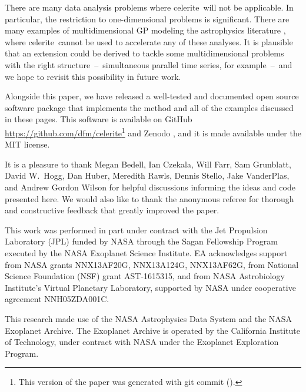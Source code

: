\documentclass[manuscript, letterpaper]{aastex6}
\makeatletter
\let\origsubsection\subsection
\renewcommand\subsection{\@ifstar{\starsubsection}{\nostarsubsection}}
\newcommand\nostarsubsection[1]{\subsectionprelude\origsubsection{#1}}
\newcommand\starsubsection[1]{\subsectionprelude\origsubsection*{#1}}
\newcommand\subsectionprelude{\vspace{1em}}
\newcommand{\project}[1]{\textsf{#1}}
\newcommand{\celerite}{\project{celerite}}
\newcommand{\response}[1]{{\color{blue}#1}}
\makeatother
\begin{document}
There are many data analysis problems where \celerite\ will not be applicable.
In particular, the restriction to one-dimensional problems is significant.
There are many examples of multidimensional GP modeling the astrophysics
literature \citep[recent examples from the field of exoplanet characterization
include][]{Haywood:2014, Rajpaul:2015, Aigrain:2016}, where \celerite\ cannot
be used to accelerate any of these analyses.
It is plausible that an extension could be derived to tackle some
multidimensional problems with the right structure~--~simultaneous parallel
time series, for example~--~and we hope to revisit this possibility in future
work.

\subsection{Code availability}

Alongside this paper, we have released a well-tested and documented open
source software package that implements the method and all of the examples
discussed in these pages.
This software is available on GitHub
\url{https://github.com/dfm/celerite}\footnote{This version of the paper was
generated with git commit \texttt{\githash} (\gitdate).} and Zenodo
\citep{Foreman-Mackey:2017}, and it is made available under the MIT license.

\acknowledgments
It is a pleasure to thank
Megan Bedell,
Ian Czekala,
Will Farr,
Sam Grunblatt,
David W.\ Hogg,
Dan Huber,
Meredith Rawls,
Dennis Stello,
Jake VanderPlas, and
Andrew Gordon Wilson
for helpful discussions informing the ideas and code presented here.
\response{We would also like to thank the anonymous referee for thorough and
constructive feedback that greatly improved the paper.}

This work was performed in part under contract with the Jet Propulsion
Laboratory (JPL) funded by NASA through the Sagan Fellowship Program executed
by the NASA Exoplanet Science Institute.
EA acknowledges support from NASA grants NNX13AF20G, NNX13A124G, NNX13AF62G,
from National Science Foundation (NSF) grant AST-1615315, and from
NASA Astrobiology Institute's Virtual Planetary Laboratory, supported
by NASA under cooperative agreement NNH05ZDA001C.

This research made use of the NASA \project{Astrophysics Data System} and the
NASA Exoplanet Archive.
The Exoplanet Archive is operated by the California Institute of Technology,
under contract with NASA under the Exoplanet Exploration Program.
\end{document}
